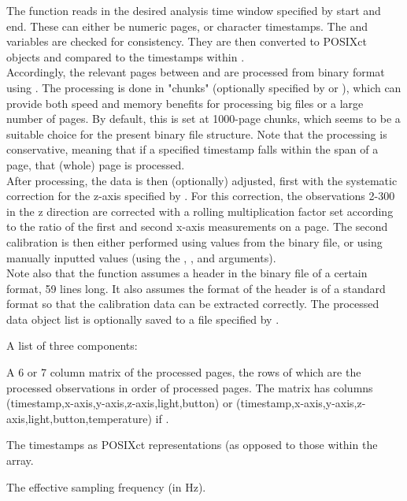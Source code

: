 \documentclass[a4paper]{book}
\begin{document}
\begin{Details}\relax
The function reads in the desired analysis time window specified by start and end.  These can either be numeric pages, or character timestamps.  The  and  variables are checked for consistency.  They are then converted to POSIXct objects and compared to the timestamps within .  \\{} Accordingly, the relevant pages between  and  are processed from binary format using .  The processing is done in "chunks" (optionally specified by  or ), which can provide both speed and memory benefits for processing big files or a large number of pages.  By default, this is set at 1000-page chunks, which seems to be a suitable choice for the present binary file structure. Note that the processing is conservative, meaning that if a specified timestamp falls within the span of a page, that (whole) page is processed.  \\{} After processing, the data is then (optionally) adjusted, first with the systematic correction for the z-axis specified by .  For this correction, the observations 2-300 in the z direction are corrected with a rolling multiplication factor set according to the ratio of the first and second x-axis measurements on a page.  The second calibration is then either performed using values from the binary file, or using manually inputted values (using the , , and  arguments).  \\{} Note also that the function assumes a header in the binary file of a certain format, 59 lines long.  It also assumes the format of the header is of a standard format so that the calibration data can be extracted correctly.  The processed data object list is optionally saved to a file specified by .
\end{Details}
%
\begin{Value}
A list of three components:
\begin{ldescription}
\item[\code{data.out}] A 6 or 7 column matrix of the processed pages, the rows of which are the processed observations in order of processed pages.  The matrix has columns (timestamp,x-axis,y-axis,z-axis,light,button) or (timestamp,x-axis,y-axis,z-axis,light,button,temperature) if .
\item[\code{page.timestamps}] The timestamps as POSIXct representations (as opposed to those within the  array.
\item[\code{freq}] The effective sampling frequency (in Hz).
\end{ldescription}
\end{Value}
\end{document}
